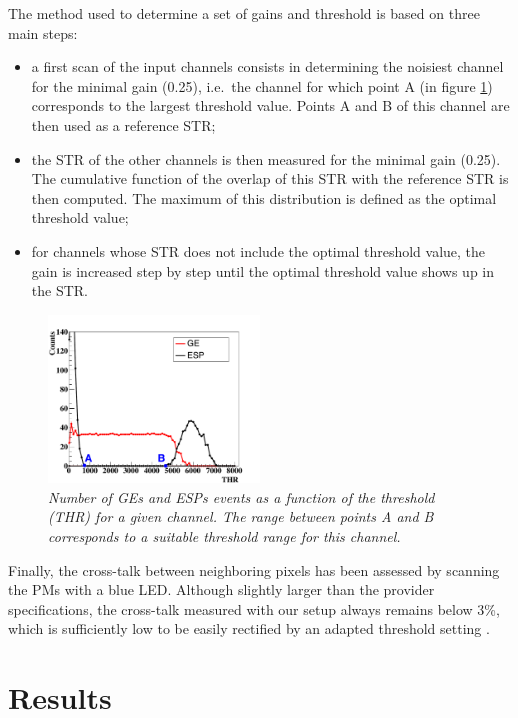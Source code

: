 \documentclass[a4paper,11pt]{article}
\begin{document}
The method used to determine a set of gains and threshold is based on three main steps:
\begin{itemize}
	\item a first scan of the input channels consists in determining the noisiest channel for the minimal gain (0.25), i.e.~the channel for which point A (in figure \ref{fig:S_Curve}) corresponds to the largest threshold value. Points A and B of this channel are then used as a reference STR;
	\item the STR of the other channels is then measured for the minimal gain (0.25). The cumulative function of the overlap of this STR with the reference STR is then computed. The maximum of this distribution is defined as the optimal threshold value;
	\item for channels whose STR does not include the optimal threshold value, the gain is increased step by step until the optimal threshold value shows up in the STR.
\end{itemize}

\begin{figure}[htb]
\centering
\includegraphics[width=0.5\textwidth]{figures/S_Curve_Thr_suitable_rangeAB.pdf}
\caption{\small{\textit{Number of GEs and ESPs events as a function of the threshold (THR) for a given channel. The range between points A and B corresponds to a suitable threshold range for this channel.}}}
\label{fig:S_Curve}
\end{figure}

Finally, the cross-talk between neighboring pixels has been assessed by scanning the PMs with a blue LED. Although slightly larger than the provider specifications, the cross-talk measured with our setup always remains below 3\%, which is sufficiently low to be easily rectified by an adapted threshold setting \cite{FontanaPhD}.

\section{Results}
\label{Results}
\end{document}
